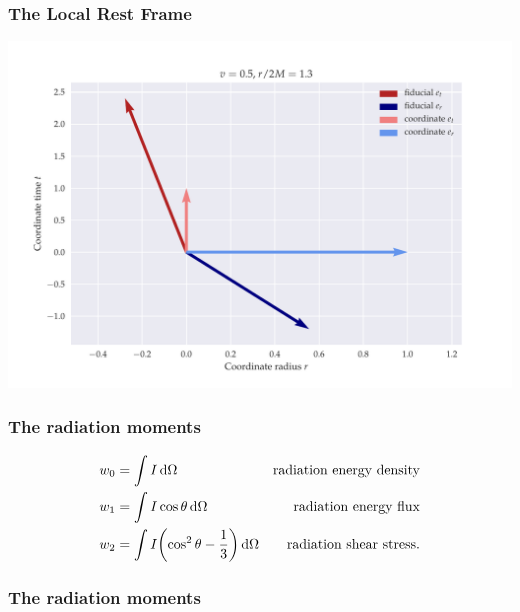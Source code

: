 \documentclass{beamer}
\begin{document}
\begin{frame}
    \frametitle{The Local Rest Frame}
        \includegraphics[width=\textwidth]{figures/high_speed}
\end{frame}

\begin{frame}
    \frametitle{The radiation moments}

    \begin{subequations}
    \begin{align*}
      w_0 &= \int I \dd{\Omega} & \text{radiation energy density} \\
      w_1 &= \int I \cos \theta \dd{\Omega} & \text{radiation energy flux} \\
      w_2 &= \int I \qty(\cos^2 \theta - \frac{1}{3}) \dd{\Omega} & \text{radiation shear stress.}
    \end{align*}
    \end{subequations}
\end{frame}

\begin{frame}
    \frametitle{The radiation moments}

\end{frame}
\end{document}
